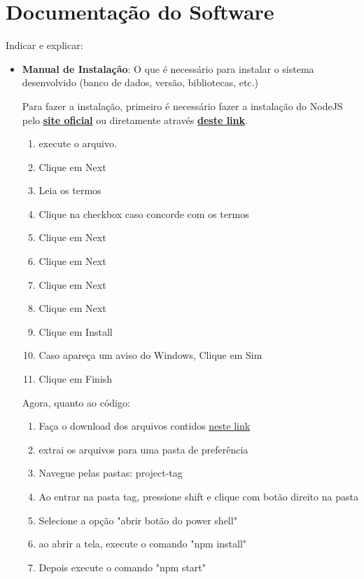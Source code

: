 \section{Documentação do Software}

    Indicar e explicar:
    \begin{itemize}
        \item \textbf{Manual de Instalação}: O que é necessário para instalar o sistema desenvolvido (banco de dados, versão, bibliotecas, etc.)
        
            Para fazer a instalação, primeiro é necessário fazer a instalação do NodeJS pelo \href{https://nodejs.org/en/}{\textbf{site oficial}} ou diretamente através \href{https://nodejs.org/dist/v18.12.1/node-v18.12.1-x64.msi}{\textbf{deste link}}.
            
            \begin{enumerate}
                \item execute o arquivo.
                \item Clique em Next
                \item Leia os termos
                \item Clique na checkbox caso concorde com os termos
                \item Clique em Next
                \item Clique em Next
                \item Clique em Next
                \item Clique em Next
                \item Clique em Install
                \item Caso apareça um aviso do Windows, Clique em Sim
                \item Clique em Finish
            \end{enumerate}
    
            Agora, quanto ao código:
            \begin{enumerate}
                \item Faça o download dos arquivos contidos \href{https://github.com/jvfd3/project-tag/archive/refs/heads/main.zip}{neste link}
                \item extrai os arquivos para uma pasta de preferência
                \item Navegue pelas pastas: project-tag
                \item Ao entrar na pasta tag, pressione shift e clique com botão direito na pasta 
                \item Selecione a opção "abrir botão do power shell"
                \item ao abrir a tela, execute o comando "npm install"
                \item Depois execute o comando "npm start"
            \end{enumerate}


\end{itemize}
